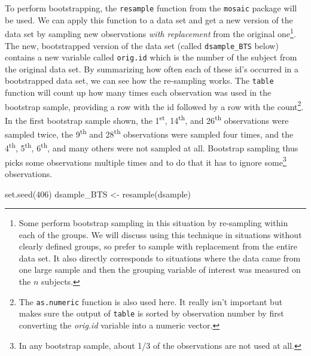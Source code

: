\documentclass[
]{book}
\newenvironment{Shaded}{\begin{snugshade}}{\end{snugshade}}
\newcommand{\DecValTok}[1]{\textcolor[rgb]{0.00,0.00,0.81}{#1}}
\newcommand{\FunctionTok}[1]{\textcolor[rgb]{0.00,0.00,0.00}{#1}}
\newcommand{\NormalTok}[1]{#1}
\newcommand{\OtherTok}[1]{\textcolor[rgb]{0.56,0.35,0.01}{#1}}
\newcommand{\SpecialCharTok}[1]{\textcolor[rgb]{0.00,0.00,0.00}{#1}}
\begin{document}
\indent To perform bootstrapping, the \texttt{resample} function from the
\texttt{mosaic} package will be used. We can apply this function to a data set and get a new
version of the
data set by sampling new observations \emph{with replacement} from the original one\footnote{Some perform bootstrap sampling in this situation by re-sampling within each of the groups. We will discuss using this technique in situations without clearly defined groups, so prefer to sample with replacement from the entire data set. It also directly corresponds to situations where the data came from one large sample and then the grouping variable of interest was measured on the \(n\) subjects.}.
The new, bootstrapped version of the data set (called \texttt{dsample\_BTS} below)
contains a new variable called \texttt{orig.id} which is the number of the subject
from the original data set. By summarizing how often each of these id's
occurred in a bootstrapped data set, we can see how the re-sampling works.
The \texttt{table} function will count up how many times each observation was used in
the bootstrap sample,
providing a row with the id followed by a row with the
count\footnote{The \texttt{as.numeric} function is also used here. It really isn't important
  but makes sure the output of \texttt{table} is sorted by observation number by first
  converting the \emph{orig.id} variable into a numeric vector.}. In the first bootstrap
sample shown, the 1\textsuperscript{st}, 14\textsuperscript{th}, and 26\textsuperscript{th} observations
were sampled twice, the 9\textsuperscript{th} and 28\textsuperscript{th} observations were sampled four
times, and the 4\textsuperscript{th}, 5\textsuperscript{th}, 6\textsuperscript{th}, and many others
were not sampled at all. Bootstrap sampling thus picks some observations
multiple times and to do that it has to ignore some\footnote{In any bootstrap sample, about 1/3 of the observations are not used at all.} observations.

\newpage

\begin{Shaded}
\begin{Highlighting}[]
\FunctionTok{set.seed}\NormalTok{(}\DecValTok{406}\NormalTok{)}
\NormalTok{dsample\_BTS }\OtherTok{\textless{}{-}} \FunctionTok{resample}\NormalTok{(dsample)}
\end{Highlighting}
\end{Shaded}

\begin{Shaded}
\end{Shaded}
\end{document}
